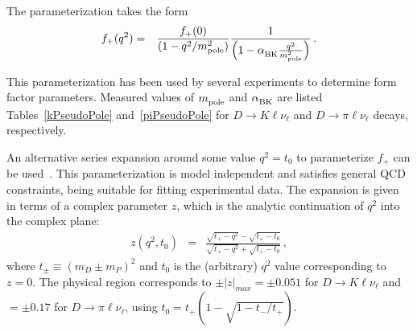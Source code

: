 The parameterization takes the form
\begin{eqnarray}
f_+(q^2) & = & \frac{f_+(0)}{(1-q^2/m^2_{\rm pole})}
\frac{1}{\left(1-\alpha^{}_{\rm BK}\frac{q^2}{m^2_{\rm pole}}\right)}\,.
\end{eqnarray}
 

This parameterization has been used by several experiments to 
determine form factor parameters.
Measured values of $m^{}_{\rm pole}$ and $\alpha^{}_{\rm BK}$ are
listed Tables~\ref{kPseudoPole} and~\ref{piPseudoPole} for
$D\to K\ell\nu_{\ell}$ and $D\to\pi\ell\nu_{\ell}$ decays, respectively.



An alternative series expansion around some value $q^2=t_0$ to parameterize 
$f^{}_+$ can be used~\cite{Boyd:1994tt,Boyd:1997qw,Arnesen:2005ez,Becher:2005bg}. This parameterization is model 
independent and satisfies general QCD constraints, being suitable for fitting experimental data.
The expansion is given in terms of a complex parameter $z$,
which is the analytic continuation of $q^2$ into the complex plane:
\begin{eqnarray}
z(q^2,t_0) & = & \frac{\sqrt{t_+ - q^2} - \sqrt{t_+ - t_0}}{\sqrt{t_+ - q^2}
	  + \sqrt{t_+ - t_0}}\,, 
\end{eqnarray}
where $t_\pm \equiv (m_D \pm m_P)^2$ and $t_0$ is the (arbitrary) $q^2$ 
value corresponding to $z=0$. The physical region corresponds to $\pm|z|_{max} = \pm 0.051$ 
for $D\to K \ell \nu_\ell$ and $= \pm 0.17$ for  $D\to \pi \ell \nu_\ell$, 
using $t_{0}= t_{+} (1-\sqrt{1-t_{-}/t_{+}})$.  

